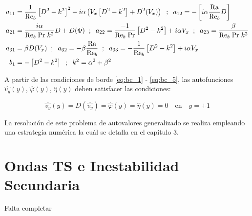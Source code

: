 \begin{align*}
a_{11} &= \frac{1}{\text{Re}_b} \left[ D^2 - k^2 \right]^2 - i \alpha \left( V_x \left[ D^2 - k^2 \right] + D^2(V_x)\right) \hspace{2mm} ; \hspace{2mm} a_{12} = -\left[ i \alpha \frac{\text{Ra}}{\text{Re}_b} D \right] \\
a_{21} &= \frac{i \alpha}{\text{Re}_b \hspace{1mm} \text{Pr} \hspace{1mm} k^2} D + D(\Phi) \hspace{2mm} ; \hspace{2mm} a_{22} = \frac{-1}{\text{Re}_b \hspace{1mm} \text{Pr} } \left[ D^2 - k^2 \right] + i \alpha V_x  \hspace{2mm} ; \hspace{2mm} a_{23} = \frac{\beta}{\text{Re}_b \hspace{1mm} \text{Pr} \hspace{1mm} k^2} \\
a_{31} &= \beta D(V_x) \hspace{2mm} ; \hspace{2mm} a_{32} = - \beta \frac{\text{Ra}}{\text{Re}_b}  \hspace{2mm} ; \hspace{2mm} a_{33} = -\frac{1}{\text{Re}_b} \left[ D^2 - k^2 \right] + i \alpha V_x \\
b_1    &= - \left[ D^2 - k^2 \right] \hspace{2mm} ; \hspace{2mm} k^2 = \alpha^2 + \beta^2 \\
\end{align*}

A partir de las condiciones de borde \ref{eq:bc_1} - \ref{eq:bc_5}, las autofunciones $\widehat{v_y}(y)$, $\widehat{\varphi}(y)$, $\widehat{\eta}(y)$ deben satisfacer las condiciones:

\begin{equation}
\widehat{v_y}(y) = D(\widehat{v_y}) = \widehat{\varphi}(y) = \widehat{\eta}(y) = 0 \quad \text{en} \quad y= \pm 1
\end{equation} 

La resolución de este problema de autovalores generalizado se realiza empleando una estrategía numérica la cuál se detalla en el capítulo 3. 

\section{Ondas TS e Inestabilidad Secundaria }

Falta completar
